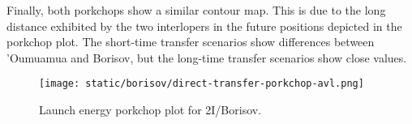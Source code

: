 Finally, both porkchops show a similar contour map. This is due to the long
distance exhibited by the two interlopers in the future positions depicted in
the porkchop plot. The short-time transfer scenarios show differences between
'Oumuamua and Borisov, but the long-time transfer scenarios show close values.

\begin{figure}[H]
  \centering
  \texttt{[image: static/borisov/direct-transfer-porkchop-avl.png]}
  \caption{Launch energy porkchop plot for 2I/Borisov.}
  \label{fig:oumuamua-direct-transfer-porkchop}
  \label{fig:borisov-direct-transfer-porkchop-avl}
\end{figure}


